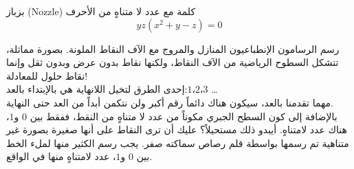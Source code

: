 \begin{surferPage}{بزباز (Nozzle)}
 كلمة مع عدد لا متناهٍ من الأحرف \\
\smallskip
\[y z (x^2	+ y - z)	= 0\]

\vspace{0.3cm}
رسم الرسامون الإنطباعيون المنازل والمروج مع الآف النقاط الملونة. بصورة مماثلة، تتشكل السطوح الرياضية من الآف النقاط، ولكنها نقاط بدون عرض وبدون  ثقل وإنما نقاط حلول للمعادلة! \\ 

\vspace{0.3cm}
إحدى الطرق لتخيل اللانهاية هي بالإبتداء بالعد:$ 1،2،3 $ \dots\\
مهما تقدمنا بالعد، سيكون هناك دائماً رقم أكبر ولن نتكمن أبداً من العد حتى النهاية.\\
\vspace{0.3cm}
بالإضافة إلى كون السطح الجبري مكوناً من عدد لا متناهٍ من النقط، ففقط بين $0$ و$1$، هناك عدد لامتناهٍ. أيبدو ذلك مستحيلاً؟ عليك أن ترى النقاط على أنها صغيرة بصورة غير متناهية تم رسمها بواسطة قلم رصاص سماكته صفر. يجب رسم الكثير منها لملء الخط بين $0$ و$1$، عدد لامتناهٍ منها في الواقع.
\end{surferPage}
